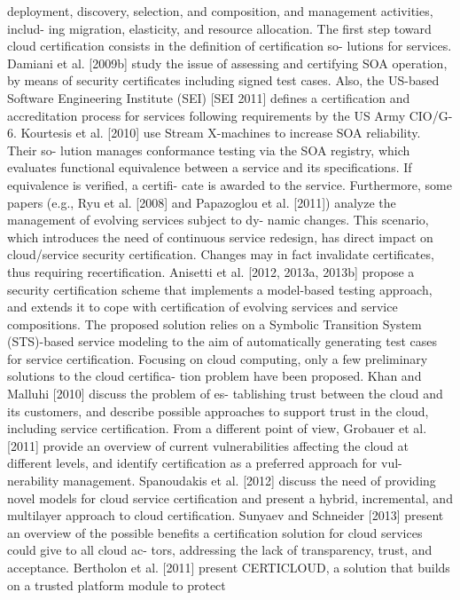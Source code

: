 \documentclass[../main.tex]{subfiles}
\begin{document}
deployment, discovery, selection, and composition, and management activities, includ-
ing migration, elasticity, and resource allocation.
The first step toward cloud certification consists in the definition of certification so-
lutions for services. Damiani et al. [2009b] study the issue of assessing and certifying
SOA operation, by means of security certificates including signed test cases. Also, the
US-based Software Engineering Institute (SEI) [SEI 2011] defines a certification and
accreditation process for services following requirements by the US Army CIO/G-6.
Kourtesis et al. [2010] use Stream X-machines to increase SOA reliability. Their so-
lution manages conformance testing via the SOA registry, which evaluates functional
equivalence between a service and its specifications. If equivalence is verified, a certifi-
cate is awarded to the service. Furthermore, some papers (e.g., Ryu et al. [2008] and
Papazoglou et al. [2011]) analyze the management of evolving services subject to dy-
namic changes. This scenario, which introduces the need of continuous service redesign,
has direct impact on cloud/service security certification. Changes may in fact invalidate
certificates, thus requiring recertification. Anisetti et al. [2012, 2013a, 2013b] propose
a security certification scheme that implements a model-based testing approach, and
extends it to cope with certification of evolving services and service compositions. The
proposed solution relies on a Symbolic Transition System (STS)-based service modeling
to the aim of automatically generating test cases for service certification.
Focusing on cloud computing, only a few preliminary solutions to the cloud certifica-
tion problem have been proposed. Khan and Malluhi [2010] discuss the problem of es-
tablishing trust between the cloud and its customers, and describe possible approaches
to support trust in the cloud, including service certification. From a different point of
view, Grobauer et al. [2011] provide an overview of current vulnerabilities affecting
the cloud at different levels, and identify certification as a preferred approach for vul-
nerability management. Spanoudakis et al. [2012] discuss the need of providing novel
models for cloud service certification and present a hybrid, incremental, and multilayer
approach to cloud certification. Sunyaev and Schneider [2013] present an overview of
the possible benefits a certification solution for cloud services could give to all cloud ac-
tors, addressing the lack of transparency, trust, and acceptance. Bertholon et al. [2011]
present CERTICLOUD, a solution that builds on a trusted platform module to protect
\end{document}
